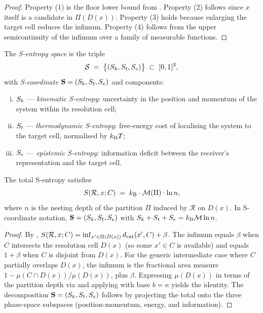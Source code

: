 \begin{proof}
Property (1) is the floor lower bound from .
Property (2) follows since $x$ itself is a candidate in $\Pi(D(x))$.
Property (3) holds because enlarging the target cell reduces the infimum.
Property (4) follows from the upper semicontinuity of the infimum over a
family of measurable functions.
\end{proof}

\begin{definition}
\label{def:s-space}
The \emph{S-entropy space} is the triple
\[
  \mathcal{S} \;=\; \bigl\{ (S_k, S_t, S_e) \bigr\} \;\subset\; [0,1]^3 ,
\]
with \emph{S-coordinate} $\mathbf{S} = (S_k, S_t, S_e)$ and components:
\begin{enumerate}[(i)]
  \item $S_k$ — \emph{kinematic S-entropy}: uncertainty in the position and
    momentum of the system within its resolution cell;
  \item $S_t$ — \emph{thermodynamic S-entropy}: free-energy cost of
    localising the system to the target cell, normalised by $k_{\mathrm{B}} T$;
  \item $S_e$ — \emph{epistemic S-entropy}: information deficit between the
    receiver's representation and the target cell.
\end{enumerate}
\end{definition}

\begin{theorem}
\label{thm:entropy-identity}
The total S-entropy satisfies
\[
  S(\mathcal{R}, x; C)
  \;=\; k_{\mathrm{B}} \cdot \mathcal{M}(\Pi) \cdot \ln n ,
\]
where $n$ is the nesting depth of the partition $\Pi$ induced by $\mathcal{R}$
on $D(x)$.  In S-coordinate notation, $\mathbf{S} = (S_k, S_t, S_e)$ with
$S_k + S_t + S_e = k_{\mathrm{B}} \mathcal{M} \ln n$.
\end{theorem}

\begin{proof}
By , $S(\mathcal{R}, x; C) = \inf_{x' \in \Pi(D(x))}
d_{\mathrm{cat}}(x', C) + \beta$.  The infimum equals $\beta$ when $C$ intersects the
resolution cell $D(x)$ (so some $x' \in C$ is available) and equals
$1 + \beta$ when $C$ is disjoint from $D(x)$.  For the generic intermediate
case where $C$ partially overlaps $D(x)$, the infimum is the fractional area
measure $1 - \mu(C \cap D(x))/\mu(D(x))$, plus $\beta$.  Expressing
$\mu(D(x))$ in terms of the partition depth via 
and applying  with base $b = n$ yields the identity.
The decomposition $\mathbf{S} = (S_k, S_t, S_e)$ follows by projecting the
total onto the three phase-space subspaces (position-momentum, energy, and
information).
\end{proof}


